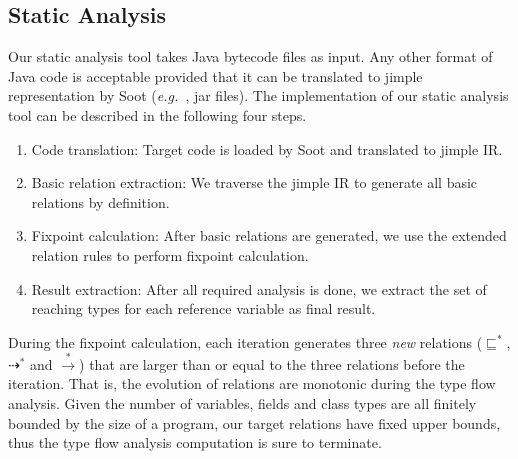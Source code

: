 \documentclass{fac}
\newcommand\eg{\textit{e.g.\ }}
\newcommand{\less}{\sqsubseteq}
\newcommand{\tflow}{\dashrightarrow}
\newcommand{\hflow}{\longrightarrow}
\newcommand{\lhflow}[1]{\stackrel{#1}{\hflow}}
\begin{document}


\subsection{Static Analysis}\label{subsec:static-analysis-tool}
Our static analysis tool %
takes Java bytecode files as input. Any other format of Java code is acceptable provided that it can be translated to jimple representation by Soot (\eg, jar files). The implementation of our static analysis tool can be described in the following four steps. %
\begin{enumerate}
\item Code translation:
Target code is loaded by Soot and translated to jimple IR. %
\item Basic relation extraction: %
We traverse the %
jimple IR to generate all basic relations by definition.
\item Fixpoint calculation:
After basic relations are generated, we use the extended relation rules to perform fixpoint calculation.
\item Result extraction:
After all required analysis is done, we extract the set of reaching types for each reference variable as final result.
\end{enumerate}

During the fixpoint calculation, each iteration generates three \emph{new} relations ($\less^*$, $\tflow^*$ and $\lhflow{*}$) that are larger than or equal to the three relations before the iteration. That is, the evolution of relations are monotonic during the type flow analysis. Given the number of variables, fields and class types are all finitely bounded by the size of a program, our target relations have fixed upper bounds, thus the type flow analysis computation is sure to terminate.
\end{document}
